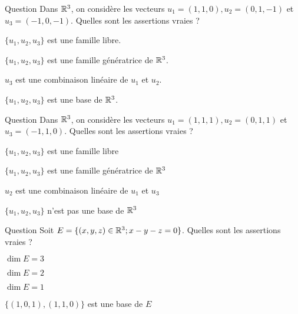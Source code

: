 \begin{multi}[multiple,feedback=
{On vérifie que \(u_3= u_2-u_1\), donc \(\{u_1,u_2,u_3\}\) n'est pas libre. Par conséquent, \(\{u_1,u_2,u_3\}\) 
n'est pas génératrice de \(\Rr^3\), sinon, \(\{u_1,u_2\}\) serait aussi génératrice de \(\Rr^3\), ce qui contredirait 
le fait que toute famille génératrice de \(\Rr^3\) doit contenir au moins \(3\) vecteurs non nuls.
}]{Question}
Dans \(\Rr^3\), on considère les vecteurs \(u_1=(1,1,0), u_2=(0,1,-1)\) et \( u_3=(-1,0,-1)\). Quelles sont les assertions vraies ?

    \item \(\{u_1,u_2,u_3\}\) est une famille libre.
    \item \(\{u_1,u_2,u_3\}\) est une famille génératrice de \(\Rr^3\).
    \item* \(u_3\) est une combinaison linéaire de \(u_1\) et \(u_2\).
    \item \(\{u_1,u_2,u_3\}\) est une base de \(\Rr^3\).
\end{multi}


\begin{multi}[multiple,feedback=
{On vérifie que \(\{u_1,u_2,u_3\}\) est une famille libre. Comme cette famille contient \(3\)  vecteurs 
linéairement indépendants de \(\Rr^3\) et la dimension de \(\Rr^3\) est \(3\), elle est génératrice de   \(\Rr^3\) et donc c'est une base de \(\Rr^3\).
}]{Question}
Dans \(\Rr^3\), on considère les vecteurs \(u_1=(1,1,1), u_2=(0,1,1)\) et \( u_3=(-1,1,0)\). 
Quelles sont les assertions vraies ?

    \item* \(\{u_1,u_2,u_3\}\) est une famille libre
    \item* \(\{u_1,u_2,u_3\}\) est une famille génératrice de \(\Rr^3\)
    \item \(u_2\) est une combinaison linéaire de \(u_1\) et \(u_3\)
    \item \(\{u_1,u_2,u_3\}\) n'est pas une base de \(\Rr^3\)
\end{multi}


\begin{multi}[multiple,feedback=
{\(E\) est un sous-espace vectoriel de \(\Rr^3\) défini par une équation linéaire homogène, donc \(\dim E=3-1=2\). On vérifie que \(\{(1,0,1),(1,1,0)\}\) est une base de \(E\).
}]{Question}
Soit \(E=\{(x,y,z) \in \mathbb{R}^3 ; x-y-z=0\}\). Quelles sont les assertions vraies ?

    \item \(\dim E = 3\)
    \item* \(\dim E = 2\)
    \item \(\dim E = 1\)
    \item* \(\{(1,0,1),(1,1,0)\} \) est une base de \(E\)
\end{multi}


